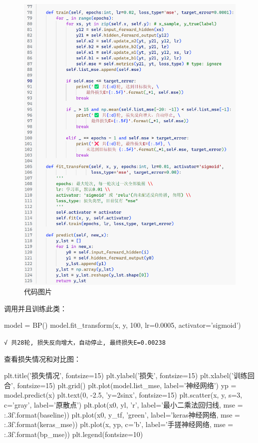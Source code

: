 \documentclass[a5paper, 11pt, openany]{book}
\begin{document}
\begin{figure}[h!]
    \centering
    \includegraphics[width=\textwidth, frame]{figures/BP3.png}
    \caption{代码图片}\label{代码图片}
\end{figure}

\newpage

调用并且训练此类：

\begin{python}[h]
model = BP()
model.fit_transform(x, y, 100, lr=0.0005, activator='sigmoid')
\end{python}

\verb|√ 共28轮, 损失反向增大，自动停止, 最终损失E=0.00238|

查看损失情况和对比图：
\begin{python}
plt.title('损失情况', fontsize=15)
plt.ylabel('损失', fontsize=15)
plt.xlabel('训练回合', fontsize=15)
plt.grid()
plt.plot(model.list_mse, label='神经网络')
yp = model.predict(x)
plt.text(0, -2.5, 'y=2sinx', fontsize=15)
plt.scatter(x, y, s=3, c='gray', label='原散点')
plt.plot(x0, yl, 'r', label='最小二乘法回归线, mse = {:.3f}'.format(baseline))
plt.plot(x0, y_tf, 'green', label='keras神经网络, mse = {:.3f}'.format(keras_mse))
plt.plot(x, yp, c='b', label='手搓神经网络, mse = {:.3f}'.format(bp_mse))
plt.legend(fontsize=10)
\end{python}
\end{document}
